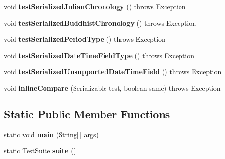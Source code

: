 \begin{DoxyCompactItemize}
\item 
\hypertarget{classorg_1_1joda_1_1time_1_1_test_serialization_ac7a5d62e84212dd29f099277d3a93cf0}{void {\bfseries test\-Serialized\-Julian\-Chronology} ()  throws Exception }\label{classorg_1_1joda_1_1time_1_1_test_serialization_ac7a5d62e84212dd29f099277d3a93cf0}

\item 
\hypertarget{classorg_1_1joda_1_1time_1_1_test_serialization_a6fd4cbebe1cfb8df8edb2f51cda1e758}{void {\bfseries test\-Serialized\-Buddhist\-Chronology} ()  throws Exception }\label{classorg_1_1joda_1_1time_1_1_test_serialization_a6fd4cbebe1cfb8df8edb2f51cda1e758}

\item 
\hypertarget{classorg_1_1joda_1_1time_1_1_test_serialization_a61e76f6fc078141a01a0541ee87b8acd}{void {\bfseries test\-Serialized\-Period\-Type} ()  throws Exception }\label{classorg_1_1joda_1_1time_1_1_test_serialization_a61e76f6fc078141a01a0541ee87b8acd}

\item 
\hypertarget{classorg_1_1joda_1_1time_1_1_test_serialization_a5367ad1ac3cd918ffc344e5a73a7e577}{void {\bfseries test\-Serialized\-Date\-Time\-Field\-Type} ()  throws Exception }\label{classorg_1_1joda_1_1time_1_1_test_serialization_a5367ad1ac3cd918ffc344e5a73a7e577}

\item 
\hypertarget{classorg_1_1joda_1_1time_1_1_test_serialization_ac55b73efb9709ac36bea0a99817421ca}{void {\bfseries test\-Serialized\-Unsupported\-Date\-Time\-Field} ()  throws Exception }\label{classorg_1_1joda_1_1time_1_1_test_serialization_ac55b73efb9709ac36bea0a99817421ca}

\item 
\hypertarget{classorg_1_1joda_1_1time_1_1_test_serialization_ac6f904e55d8dc76f070d06a8a09d63c4}{void {\bfseries inline\-Compare} (Serializable test, boolean same)  throws Exception }\label{classorg_1_1joda_1_1time_1_1_test_serialization_ac6f904e55d8dc76f070d06a8a09d63c4}

\end{DoxyCompactItemize}
\subsection*{Static Public Member Functions}
\begin{DoxyCompactItemize}
\item 
\hypertarget{classorg_1_1joda_1_1time_1_1_test_serialization_a857ee46174e69d6dd4eab94cf003a928}{static void {\bfseries main} (String\mbox{[}$\,$\mbox{]} args)}\label{classorg_1_1joda_1_1time_1_1_test_serialization_a857ee46174e69d6dd4eab94cf003a928}

\item 
\hypertarget{classorg_1_1joda_1_1time_1_1_test_serialization_a18b148d3b612738c73a8cc656ec73968}{static Test\-Suite {\bfseries suite} ()}\label{classorg_1_1joda_1_1time_1_1_test_serialization_a18b148d3b612738c73a8cc656ec73968}

\end{DoxyCompactItemize}
